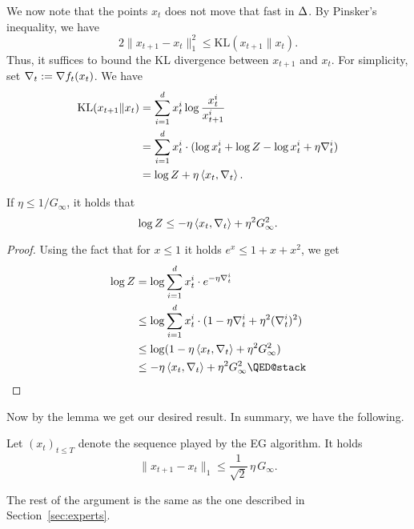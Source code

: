 We now note that the points $x_t$ does not move that fast in $\Delta$. By Pinsker's inequality, we have
\[
    2\|x_{t+1} - x_t\|_1^2 \leq \mathrm{KL}(x_{t+1}\|x_t).
\]
Thus, it suffices to bound the KL divergence between $x_{t+1}$ and $x_t$. For simplicity, set $\nabla_t := \nabla f_t(x_t)$. We have
\begin{align*}
    \mathrm{KL}(x_{t+1}\|x_t) &= \sum_{i=1}^d x_t^i \log\frac{x_t^i}{x_{t+1}^i} \\
                              &= \sum_{i=1}^d x_t^i \cdot (\log x_t^i + \log Z - \log x_{t}^i + \eta \nabla_t^i) \\
                              &= \log Z + \eta \left\langle x_t,\nabla_t \right\rangle.
\end{align*}
\begin{lemma}
    If $\eta \leq 1/G_\infty$, it holds that
    \[
        \log Z \leq -\eta\left\langle x_t,\nabla_t \right\rangle + \eta^2 G_\infty^2.
    \]
\end{lemma}
\begin{proof}
    Using the fact that for $x \leq 1$ it holds $e^x \leq 1 + x + x^2$, we get
    \begin{align*}
        \log Z &= \log \sum_{i=1}^d x_t^i \cdot e^{-\eta \grad_t^i} \\
               &\leq \log \sum_{i=1}^d x_t^i\cdot (1 - \eta\grad_t^i + \eta^2(\grad_t^i)^2) \\
               &\leq \log (1 - \eta\inner{x_t}{\grad_t} + \eta^2G_\infty^2) \\
               &\leq - \eta\inner{x_t}{\grad_t} + \eta^2G_\infty^2 \qedhere
    \end{align*}
\end{proof}

Now by the lemma we get our desired result. In summary, we have the following.
\begin{proposition}
    Let $(x_t)_{t\leq T}$ denote the sequence played by the EG algorithm. It holds
    \[
        \|x_{t+1} - x_t\|_1 \leq \frac{1}{\sqrt{2}}\,\eta\, G_\infty.
    \]
\end{proposition}

The rest of the argument is the same as the one described in Section~\ref{sec:experts}.
